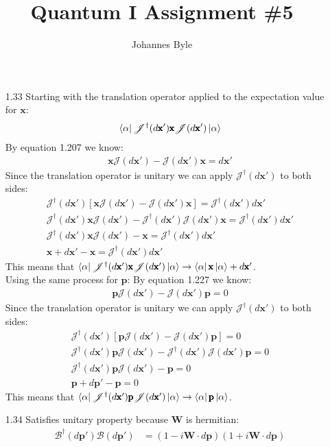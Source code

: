 \documentclass[12pt]{article}
\title{Quantum I Assignment \#5}
\author{Johannes Byle}
\newcommand{\opx}{\pmb{\text{x}}}
\newcommand{\jac}{\mathscr{J}(d\opx')}
\newcommand{\jacdag}{\mathscr{J}^{\dag}(d\opx')}
\newcommand{\opp}{\pmb{\text{p}}}
\newcommand{\boost}{\mathscr{B}(d\opp')}
\newcommand{\boostdag}{\mathscr{B}^{\dag}(d\opp')}
\newcommand{\opw}{\pmb{\text{W}}}
\begin{document}
    \maketitle
    \begin{enumerate}
        \item[1.33] Starting with the translation operator applied to the expectation value for $\opx$:
        \begin{gather*}
            \bra{\alpha}\jacdag\opx\jac\ket{\alpha}\\
        \end{gather*}
        By equation 1.207 we know:
        \begin{gather*}
            \opx\jac-\jac\opx=d\opx'
        \end{gather*}
        Since the translation operator is unitary we can apply $\jacdag$ to both sides:
        \begin{gather*}
            \jacdag\left[\opx\jac-\jac\opx\right]=\jacdag d\opx'\\
            \jacdag \opx\jac-\jacdag\jac\opx=\jacdag d\opx'\\
            \jacdag \opx\jac-\opx=\jacdag d\opx'\\
            \opx+d\opx'-\opx=\jacdag d\opx'
        \end{gather*}
        This means that $\bra{\alpha}\jacdag\opx\jac\ket{\alpha}\rightarrow\bra{\alpha}\opx\ket{\alpha}+d\opx'$.\\
        Using the same process for $\opp$:
        By equation 1.227 we know:
        \begin{gather*}
            \opp\jac-\jac\opp=0
        \end{gather*}
        Since the translation operator is unitary we can apply $\jacdag$ to both sides:
        \begin{gather*}
            \jacdag\left[\opp\jac-\jac\opp\right]=0\\
            \jacdag \opp\jac-\jacdag\jac\opp=0\\
            \jacdag \opp\jac-\opp=0\\
            \opp+d\opp'-\opp=0
        \end{gather*}
        This means that $\bra{\alpha}\jacdag\opp\jac\ket{\alpha}\rightarrow\bra{\alpha}\opp\ket{\alpha}$.\\
        \item[1.34] Satisfies unitary property because $\opw$ is hermitian:
        \begin{align*}
            \boostdag\boost&=(1-i\opw\cdot d\opp)(1+i\opw\cdot d\opp)\\

\end{align*}
\end{enumerate}
\end{document}
